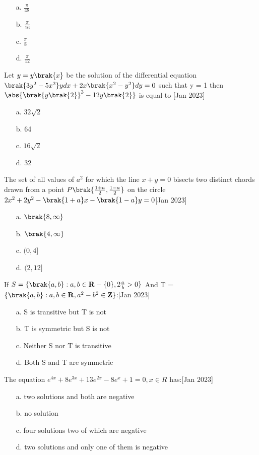  \begin{enumerate}
    \item [a.] $\frac{\pi}{48}$
    \item [b.] $\frac{\pi}{16}$
    \item [c.] $\frac{\pi}{8}$
    \item [d.] $\frac{\pi}{12}$
\end{enumerate}
\item Let $y=y\brak{x}$ be the solution of the differential equation $\brak{3y^2-5x^2}ydx+2x\brak{x^2-y^2}dy=0$ such that y = 1 then $\abs{\brak{y\brak{2}}^3-12y\brak{2}}$ is equal to \hfill  [Jan 2023]
\begin{enumerate}
    \item [a.] $32\sqrt{2}$
    \item [b.] 64
    \item [c.] $16\sqrt{2}$
    \item [d.] 32
\end{enumerate}
\item The set of all values of $a^2$ for which the line $x+y=0$ bisects two distinct chords drawn from a point $P\brak{\frac{1+a}{2}, \frac{1-a}{2}}$ on the circle $2x^2 + 2y^2-\brak{1+a}x-\brak{1-a}y=0$\hfill  [Jan 2023]
\begin{enumerate}
\item [a.] $\brak{8,\infty}$
    \item [b.] $\brak{4,\infty}$
    \item [c.] $(0,4]$
    \item [d.] $(2,12]$
\end{enumerate}
\item If $S = \{\brak{a,b}:a,b \in \mathbf{R}-\{0\},2\frac{a}{b}>0\}$ And T = $\{\brak{a,b}:a,b \in \mathbf{R}, a^2-b^2 \in \mathbf{Z}\}$:\hfill  [Jan 2023]
\begin{enumerate}
 \item [a.] S is transitive but T is not 
    \item [b.] T is symmetric but S is not 
    \item [c.] Neither S nor T is transitive 
    \item [d.] Both S and T are symmetric 
\end{enumerate}
\item The equation $e^{4x} + 8e^{3x} + 13e^{2x} - 8e^x + 1 = 0, x \in R$ has:\hfill  [Jan 2023]
\begin{enumerate}
    \item [a.] two solutions and both are negative 
    \item [b.] no solution 
    \item [c.] four solutions two of which are negative 
    \item [d.] two solutions and only one of them is negative
\end{enumerate}
